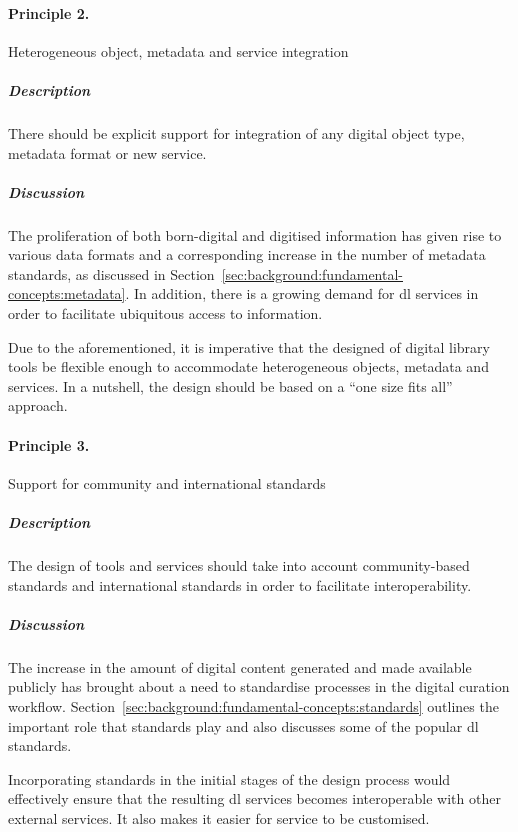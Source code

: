 \paragraph{Principle 2.} Heterogeneous object, metadata and service integration

\subparagraph{Description} There should be explicit support for integration of
any
digital object type, metadata format or new service.


\subparagraph{Discussion} The proliferation of both born-digital and digitised
information has given rise to various data formats and a corresponding increase
in the number of metadata standards, as discussed in Section~\ref{sec:background:fundamental-concepts:metadata}. In addition, there is a
growing demand for \gls{dl} services in order to facilitate ubiquitous
access to information.

Due to the aforementioned, it is imperative that the designed of digital
library tools be flexible enough to accommodate heterogeneous
objects, metadata and services. In a nutshell, the design should be based on a
``one size fits all'' approach.

\paragraph{Principle 3.} Support for community and international standards

\subparagraph{Description} The design of tools and services should take into
account community-based standards and international standards in order to
facilitate interoperability.


\subparagraph{Discussion} The increase in the amount of digital content
generated and made available publicly has brought about a need to
standardise processes in the digital curation workflow. Section~\ref{sec:background:fundamental-concepts:standards} outlines the important
role that standards play and also discusses some of the popular \gls{dl}
standards.

Incorporating standards in the initial stages of the design process would
effectively ensure that the resulting \gls{dl} services becomes
interoperable with other external services. It also makes it easier for service
to be customised.

